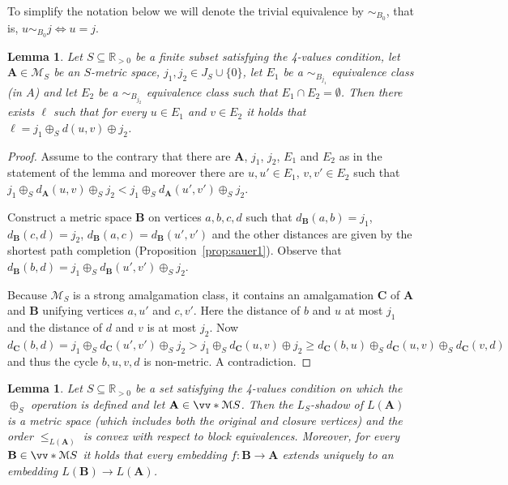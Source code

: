 \documentclass{elsarticle}
\def\ordclasssup#1#2{\vv*{#1}{#2}}
\def\str#1{\mathbf {#1}}
\theoremstyle{plain}
\newtheorem{lemma}[theorem]{Lemma}
\theoremstyle{definition}
\theoremstyle{remark}
\begin{document}
To simplify the notation below we will denote the trivial equivalence by $\sim_{B_0}$, that is, $u\sim_{B_0} j\iff u=j$.
\begin{lemma}
\label{lem:samedist}
Let $S\subseteq \mathbb R_{>0}$ be a finite subset satisfying the 4-values condition, let $\str{A}\in \mathcal M_S$ be an $S$-metric space, $j_1,j_2\in
J_S\cup \{0\}$, let $E_1$ be a $\sim_{B_{j_1}}$ equivalence class (in $A$) and let $E_2$ be a 
$\sim_{B_{j_2}}$ equivalence class such that $E_1\cap E_2=\emptyset$.
Then there exists $\ell$ such that for every $u\in E_1$ and $v\in E_2$ it holds
that $\ell=j_1\oplus_S d(u,v)\oplus j_2$.
\end{lemma}
\begin{proof}
Assume to the contrary that there are $\str{A}$, $j_1$, $j_2$, $E_1$ and $E_2$ as
in the statement of the lemma and moreover there are $u,u'\in E_1$, $v,v'\in E_2$ such
that $j_1\oplus_S d_\str{A}(u,v)\oplus_S j_2<j_1\oplus_S d_\str{A}(u',v')\oplus_S j_2$.

Construct a metric space $\str{B}$ on vertices $a,b,c,d$ such that $d_\str{B}(a,b)=j_1$,
$d_\str{B}(c,d)=j_2$, $d_\str{B}(a,c)=d_\str{B}(u',v')$ and the other distances are given  
by the shortest path completion (Proposition~\ref{prop:sauer1}). Observe that $d_\str{B}(b,d)=j_1\oplus_S d_\str{B}(u',v')\oplus_S j_2$.

Because $\mathcal M_S$ is a strong amalgamation class, it contains an
amalgamation $\str{C}$ of $\str{A}$ and $\str{B}$ unifying vertices $a,u'$ and $c,v'$.
Here the distance of $b$ and $u$ at most $j_1$ and the distance of $d$ and $v$
is at most $j_2$. Now $d_\str{C}(b,d)=j_1\oplus_S d_\str{C}(u',v')\oplus_S j_2
>j_1\oplus_S d_\str{C}(u,v)\oplus j_2\geq d_\str{C}(b,u)\oplus_S d_\str{C}(u,v)\oplus_S
d_\str{C}(v,d)$ and thus the cycle $b,u,v,d$ is non-metric.  A contradiction.
\end{proof}
\begin{lemma}
\label{lem:Smetricemb}
Let $S\subseteq \mathbb R_{>0}$ be a set satisfying the 4-values condition on which the $\oplus_S$ operation is
defined and let $\str{A}\in \ordclasssup{\mathcal M}{S}$. Then the $L_S$-shadow of $L(\str{A})$ is a metric
space (which includes both the original and closure vertices) and the order $\leq_{L(\str{A})}$ is convex with respect to block equivalences.
 Moreover, for every $\str{B}\in \ordclasssup{\mathcal M}{S}$ it holds that every embedding $f\colon\str{B}\to \str{A}$ extends uniquely
to an embedding $L(\str{B})\to L(\str{A})$.
\end{lemma}
\end{document}
